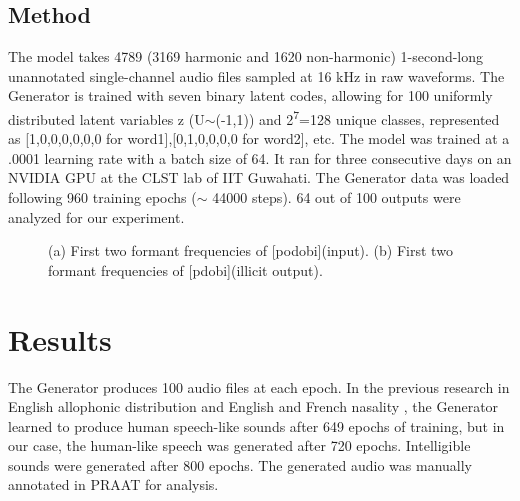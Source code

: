 \documentclass{Interspeech2024}
\begin{document}
\begin{table}
\caption{Example dataset for training fiwGAN}
\label{tab:accents}
\centering
{}

\end{table}

\subsection{Method}
The model takes 4789 (3169 harmonic and 1620 non-harmonic) 1-second-long unannotated single-channel audio files sampled at 16 kHz in raw waveforms. The Generator is trained with seven binary latent codes, allowing for 100 uniformly distributed latent variables z (U$\sim$(-1,1)) and 2\textsuperscript{7}=128 unique classes, represented as [1,0,0,0,0,0,0 for word1],[0,1,0,0,0,0 for word2], etc. The model was trained at a .0001 learning rate with a batch size of 64. It ran for three consecutive days on an NVIDIA GPU at the CLST lab of IIT Guwahati. The Generator data was loaded following 960 training epochs ($\sim$ 44000 steps). 64 out of 100 outputs were analyzed for our experiment. 
\begin{figure}[!t]
    \label{fig:formants}
    \centering
    
    \caption{(a) First two formant frequencies of [podobi](input). (b) First two formant frequencies of [p\textopeno dobi](illicit output).}
\end{figure}
\section{Results}
The Generator produces 100 audio files at each epoch. In the previous research in English allophonic distribution \cite{begus_identity-based_2021} and English and French nasality \cite{chen_exploring_2023}, the Generator learned to produce human speech-like sounds after 649 epochs of training, but in our case, the human-like speech was generated after 720 epochs. Intelligible sounds were generated after 800 epochs. The generated audio was manually annotated in PRAAT\cite{boersma_praat_2009} for analysis.  
\end{document}
